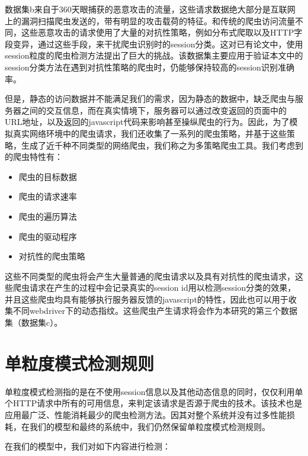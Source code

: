 \documentclass[doctor,privacy,twoside]{buaa_mac}
\begin{document}
数据集b来自于360天眼捕获的恶意攻击的流量，这些请求数据绝大部分是互联网上的漏洞扫描爬虫发送的，带有明显的攻击载荷的特征。和传统的爬虫访问流量不同，这些恶意攻击的请求使用了大量的对抗性策略，例如分布式爬取以及HTTP字段变异，通过这些手段，来干扰爬虫识别时的session分类。这对已有论文中，使用session粒度的爬虫检测方法提出了巨大的挑战。该数据集主要应用于验证本文中的session分类方法在遇到对抗性策略的爬虫时，仍能够保持较高的session识别准确率。

但是，静态的访问数据并不能满足我们的需求，因为静态的数据中，缺乏爬虫与服务器之间的交互信息，而在真实情境下，服务器可以通过改变返回的页面中的URL地址，以及返回的javascript代码来影响甚至操纵爬虫的行为。因此，为了模拟真实网络环境中的爬虫请求，我们还收集了一系列的爬虫策略，并基于这些策略，生成了近千种不同类型的网络爬虫，我们称之为多策略爬虫工具。我们考虑到的爬虫特性有：
\begin{itemize}
\item 爬虫的目标数据
\item 爬虫的请求速率
\item 爬虫的遍历算法
\item 爬虫的驱动程序
\item 对抗性的爬虫策略
\end{itemize}

这些不同类型的爬虫将会产生大量普通的爬虫请求以及具有对抗性的爬虫请求，这些爬虫请求在产生的过程中会记录真实的session id用以检测session分类的效果，并且这些爬虫均具有能够执行服务器反馈的javascript的特性，因此也可以用于收集不同webdriver下的动态指纹。这些爬虫产生请求将会作为本研究的第三个数据集（数据集c）。


\section{单粒度模式检测规则}
单粒度模式检测指的是在不使用session信息以及其他动态信息的同时，仅仅利用单个HTTP请求中所有的可用信息，来判定该请求是否源于爬虫的技术。该技术也是应用最广泛、性能消耗最少的爬虫检测方法。因其对整个系统并没有过多性能损耗，在我们的模型和最终的系统中，我们仍然保留单粒度模式检测规则。

在我们的模型中，我们对如下内容进行检测：
\end{document}
